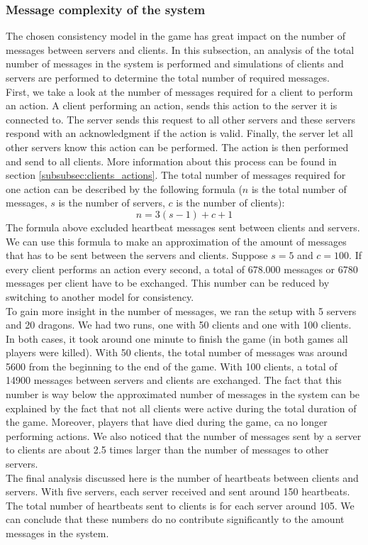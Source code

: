 	\subsubsection{Message complexity of the system}
	\label{subsubsec:nummessages}
		The chosen consistency model in the game has great impact on the number of messages between servers and clients. 
		In this subsection, an analysis of the total number of messages in the system is performed and simulations of clients and servers are performed to determine the total number of required messages.\\
		First, we take a look at the number of messages required for a client to perform an action. 
		A client performing an action, sends this action to the server it is connected to. 
		The server sends this request to all other servers and these servers respond with an acknowledgment if the action is valid. 
		Finally, the server let all other servers know this action can be performed. 
		The action is then performed and send to all clients. 
		More information about this process can be found in section \ref{subsubsec:clients_actions}. 
		The total number of messages required for one action can be described by the following formula ($ n $ is the total number of messages, $ s $ is the number of servers, $ c $ is the number of clients):
		$$ n = 3(s - 1) + c + 1 $$
		The formula above excluded heartbeat messages sent between clients and servers.
		We can use this formula to make an approximation of the amount of messages that has to be sent between the servers and clients. 
		Suppose $ s = 5 $ and $ c = 100 $. 
		If every client performs an action every second, a total of 678.000 messages or 6780 messages per client have to be exchanged. 
		This number can be reduced by switching to another model for consistency.\\
		To gain more insight in the number of messages, we ran the setup with 5 servers and 20 dragons. 
		We had two runs, one with 50 clients and one with 100 clients. 
		In both cases, it took around one minute to finish the game (in both games all players were killed). 
		With 50 clients, the total number of messages was around 5600 from the beginning to the end of the game. 
		With 100 clients, a total of 14900 messages between servers and clients are exchanged. 
		The fact that this number is way below the approximated number of messages in the system can be explained by the fact that not all clients were active during the total duration of the game. 
		Moreover, players that have died during the game, ca no longer performing actions. We also noticed that the number of messages sent by a server to clients are about 2.5 times larger than the number of messages to other servers.\\
		The final analysis discussed here is the number of heartbeats between clients and servers. 
		With five servers, each server received and sent around 150 heartbeats. 
		The total number of heartbeats sent to clients is for each server around 105. 
		We can conclude that these numbers do no contribute significantly to the amount messages in the system.
